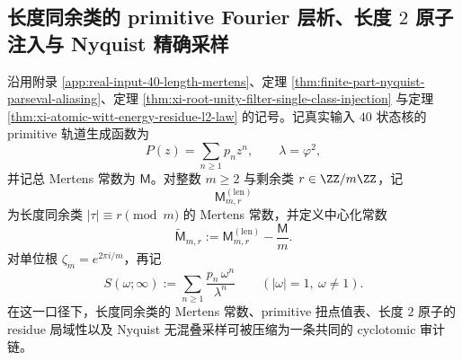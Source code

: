 \subsection{长度同余类的 primitive Fourier 层析、长度 \texorpdfstring{$2$}{2} 原子注入与 Nyquist 精确采样}\label{subsec:conclusion-length-congruence-primitive-fourier-nyquist-shadow}
沿用附录 \ref{app:real-input-40-length-mertens}、定理 \ref{thm:finite-part-nyquist-parseval-aliasing}、定理 \ref{thm:xi-root-unity-filter-single-class-injection} 与定理 \ref{thm:xi-atomic-witt-energy-residue-l2-law} 的记号。记真实输入 \(40\) 状态核的 primitive 轨道生成函数为
\[
P(z)=\sum_{n\ge 1}p_n z^n,
\qquad
\lambda=\varphi^2,
\]
并记总 Mertens 常数为 \(\mathsf M\)。对整数 \(m\ge 2\) 与剩余类 \(r\in \ZZ/m\ZZ\)，记
\[
\mathsf M_{m,r}^{(\mathrm{len})}
\]
为长度同余类 \(|\tau|\equiv r\pmod m\) 的 Mertens 常数，并定义中心化常数
\[
\widetilde{\mathsf M}_{m,r}
:=
\mathsf M_{m,r}^{(\mathrm{len})}-\frac{\mathsf M}{m}.
\]
对单位根 \(\zeta_m=e^{2\pi i/m}\)，再记
\[
S(\omega;\infty):=\sum_{n\ge 1}\frac{p_n\,\omega^n}{\lambda^n}
\qquad (|\omega|=1,\ \omega\neq 1).
\]
在这一口径下，长度同余类的 Mertens 常数、primitive 扭点值表、长度 \(2\) 原子的 residue 局域性以及 Nyquist 无混叠采样可被压缩为一条共同的 cyclotomic 审计链。

